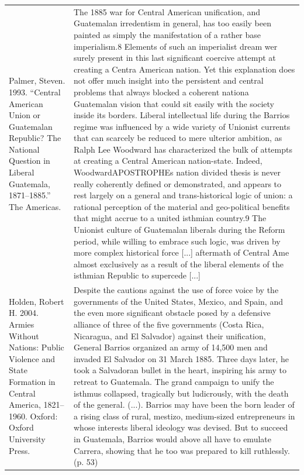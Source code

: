 {\begin{longtable}{p{}p{}}
Palmer, Steven. 1993. “Central American Union or Guatemalan Republic? The National Question in Liberal Guatemala, 1871–1885.” The Americas. & The 1885 war for Central American unification, and Guatemalan irredentism in general, has too easily been painted as simply the manifestation of a rather base imperialism.8 Elements of such an imperialist dream wer surely present in this last significant coercive attempt at creating a Centra American nation. Yet this explanation does not offer much insight into the persistent and central problems that always blocked a coherent nationa Guatemalan vision that could sit easily with the society inside its borders. Liberal intellectual life during the Barrios regime was influenced by a wide variety of Unionist currents that can scarcely be reduced to mere ulterior ambition, as Ralph Lee Woodward has characterized the bulk of attempts at creating a Central American nation-state. Indeed, WoodwardAPOSTROPHEs nation divided thesis is never really coherently defined or demonstrated, and appears to rest largely on a general and trans-historical logic of union: a rational perception of the material and geo-political benefits that might accrue to a united isthmian country.9 The Unionist culture of Guatemalan liberals during the Reform period, while willing to embrace such logic, was driven by more complex historical force [...] aftermath of Central Ame almost exclusively as a result of the liberal elements of the isthmian Republic to supercede [...]
\\
Holden, Robert H. 2004. Armies Without Nations: Public Violence and State Formation in Central America, 1821–1960. Oxford: Oxford University Press. & Despite the cautions against the use of force voice by the governments of the United States, Mexico, and Spain, and the even more significant obstacle posed by a defensive alliance of three of the five governments (Costa Rica, Nicaragua, and El Salvador) against their unification, General Barrios organized an army of 14,500 men and invaded El Salvador on 31 March 1885. Three days later, he took a Salvadoran bullet in the heart, inspiring his army to retreat to Guatemala. The grand campaign to unify the isthmus collapsed, tragically but ludicrously, with the death of the general. (...). Barrios may have been the born leader of a rising class of rural, mestizo, medium-sized entrepreneurs in whose interests liberal ideology was devised. But to succeed in Guatemala, Barrios would above all have to emulate Carrera, showing that he too was prepared to kill ruthlessly. (p. 53)
\\

\end{longtable}}
